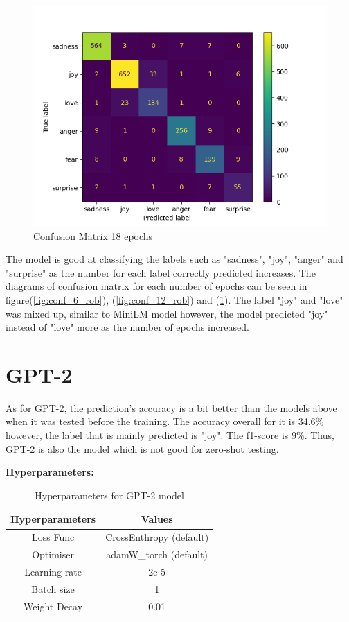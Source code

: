 \begin{figure}[h!]
\begin{minipage}{.5\textwidth}
        \centering
        \includegraphics[width=1\linewidth]{Figures/conf_metrix_roberta_18_epochs.png}
        \caption{Confusion Matrix 18 epochs}
        \label{fig:conf_18_rob}
    \end{minipage}%
\end{figure}

The model is good at classifying the labels such as "sadness", "joy", "anger" and "surprise" as the number for each label correctly predicted increases. The diagrams of confusion matrix for each number of epochs can be seen in figure(\ref{fig:conf_6_rob}), (\ref{fig:conf_12_rob}) and (\ref{fig:conf_18_rob}). The label "joy" and "love" was mixed up, similar to MiniLM model however, the model predicted "joy" instead of "love" more as the number of epochs increased.

\section{GPT-2}
As for GPT-2, the prediction's accuracy is a bit better than the models above when it was tested before the training. The accuracy overall for it is 34.6\% however, the label that is mainly predicted is "joy". The f1-score is 9\%. Thus, GPT-2 is also the model which is not good for zero-shot testing.
\bigskip
\bigskip
\bigskip
\bigskip
\bigskip
\bigskip
\bigskip

\textbf{Hyperparameters:}

\begin{table}[h!]
    \centering
    \begin{tabular}{c|c}
        Hyperparameters & Values\\\hline
        Loss Func & CrossEnthropy (default)\\
        Optimiser & adamW\_torch (default)\\
        Learning rate & 2e-5\\
        Batch size & 1\\
        Weight Decay & 0.01\\
    \end{tabular}
    \caption{Hyperparameters for GPT-2 model}
    \label{tab:hyp_GPT}
\end{table}

